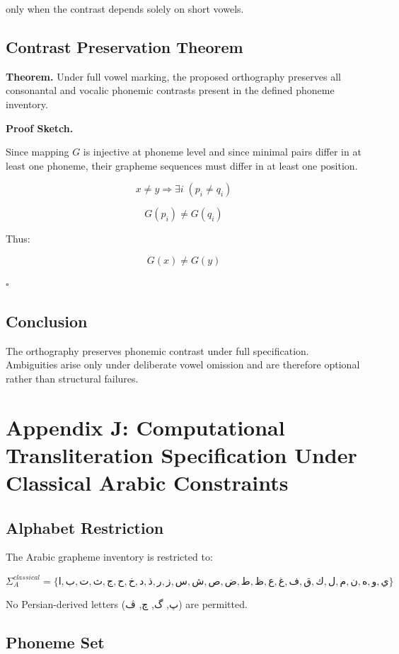 \documentclass[12pt]{article}
\begin{document}
only when the contrast depends solely on short vowels.

\subsection{Contrast Preservation Theorem}

\textbf{Theorem.}  
Under full vowel marking, the proposed orthography preserves all consonantal and vocalic phonemic contrasts present in the defined phoneme inventory.

\textbf{Proof Sketch.}

Since mapping \( G \) is injective at phoneme level and since minimal pairs differ in at least one phoneme, their grapheme sequences must differ in at least one position.

\[
x \neq y \Rightarrow \exists i \; (p_i \neq q_i)
\]

\[
G(p_i) \neq G(q_i)
\]

Thus:

\[
G(x) \neq G(y)
\]

\hfill \( \square \)

\subsection{Conclusion}

The orthography preserves phonemic contrast under full specification. Ambiguities arise only under deliberate vowel omission and are therefore optional rather than structural failures.

\section{Appendix J: Computational Transliteration Specification Under Classical Arabic Constraints}

\subsection{Alphabet Restriction}

The Arabic grapheme inventory is restricted to:

\[
\Sigma_A^{classical}
=
\{ ا, ب, ت, ث, ج, ح, خ, د, ذ, ر, ز, س, ش, ص, ض, ط, ظ, ع, غ, ف, ق, ك, ل, م, ن, ه, و, ي \}
\]

No Persian-derived letters (پ, گ, چ, ڤ) are permitted.

\subsection{Phoneme Set}
\end{document}
